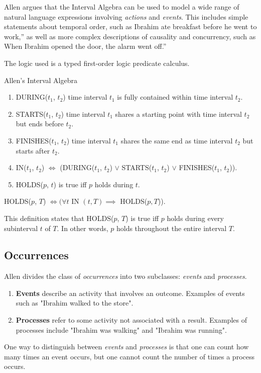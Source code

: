Allen argues that the Interval Algebra can be used to model a wide range of natural language expressions involving \textit{actions} and \textit{events}. This includes simple statements about temporal order, such as Ibrahim ate breakfast before he went to work,'' as well as more complex descriptions of causality and concurrency, such as When Ibrahim opened the door, the alarm went off.''


\pagebreak
The logic used is a typed first-order logic predicate calculus.

\begin{exmp} Allen's Interval Algebra

\begin{enumerate}
  \item DURING($t_1$, $t_2$) time interval $t_1$ is fully contained within time interval $t_2$.

  \item STARTS($t_1$, $t_2$) time interval $t_1$ shares a starting point with time interval $t_2$ but ends before $t_2$.

  \item FINISHES($t_1$, $t_2$) time interval $t_1$ shares the same end as time interval $t_2$ but starts after $t_2$.

  \item IN($t_1$, $t_2$) $\iff$ (DURING($t_1$, $t_2$) $\lor$ STARTS($t_1$, $t_2$) $\lor$ FINISHES($t_1$, $t_2$)). 

  \item HOLDS(\(p\), \(t\)) is true iff \(p\) holds during \(t\).
\end{enumerate}



\begin{center}
  HOLDS(\(p\), \(T\)) \(\iff ( \forall t \) IN $ (t,T) \implies $ HOLDS($ p, T $)).
\end{center}

This definition states that HOLDS($p$, $T$) is true iff $p$ holds during every subinterval $t$ of $T$. In other words, $p$ holds throughout the entire interval $T$.
\end{exmp}

\subsection{Occurrences}
Allen divides the class of \textit{occurrences} into two subclasses: \textit{events} and \textit{processes}.
\begin{enumerate}
  \item \textbf{Events} describe an activity that involves an outcome. Examples of events such as "Ibrahim walked to the store".

  \item \textbf{Processes} refer to some activity not associated with a result. Examples of processes include "Ibrahim was walking" and "Ibrahim was running".
\end{enumerate}
One way to distinguish between \textit{events} and \textit{processes} is that one can count how many times an event occurs, but one cannot count 
the number of times a process occurs.

